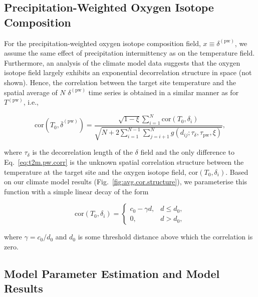 \documentclass[draft]{agujournal2019}
\begin{document}
\subsection{Precipitation-Weighted Oxygen Isotope Composition}
\label{app:concept.model.oxy.pw}

For the precipitation-weighted oxygen isotope composition field, $x \equiv
\delta^{\mathrm{(pw)}}$, we assume the same effect of precipitation
intermittency as on the temperature field. Furthermore, an analysis of the
climate model data suggests that the oxygen isotope field largely exhibits
an exponential decorrelation structure in space (not shown). Hence, the
correlation between the target site temperature and the spatial average of $N$
$\delta^{\mathrm{(pw)}}$ time series is obtained in a similar manner as for
$T^{\mathrm{(pw)}}$, i.e.,
%
\begin{linenomath*}
\begin{equation}
\label{eq:oxy.pw.corr}
\mathrm{cor}\left(T_0,
  \overline{\delta}^{\mathrm{(pw)}}\right)=
\frac
{\sqrt{1-\xi}\sum_{i=1}^{N}\mathrm{cor}\left(T_0,\delta_i\right)}
{\sqrt{N + 2\sum_{i=1}^{N-1}\sum_{j=i+1}^{N}
  g(d_{ij}; \tau_{\delta}, \tau_{\mathrm{pw}}, \xi)}},
\end{equation}
\end{linenomath*}
%
where $\tau_{\delta}$ is the decorrelation length of the $\delta$ field and the
only difference to Eq.~\eqref{eq:t2m.pw.corr} is the unknown spatial correlation
structure between the temperature at the target site and the oxygen isotope
field, $\mathrm{cor}\left(T_0,\delta_i\right)$.  Based on our climate model
results (Fig.~\ref{fig:avg.cor.structure}), we parameterise this function with a
simple linear decay of the form
%
\begin{linenomath*}
\begin{equation}
\label{eq:t2m.oxy.corr}
\mathrm{cor}\left(T_0,\delta_i\right)=
\begin{cases}
  c_0 - \gamma d, & d \le d_0,\\
  0, & d > d_0,
\end{cases}
\end{equation}
\end{linenomath*}
%
where $\gamma=c_0/d_0$ and $d_0$ is some threshold distance above which
the correlation is zero.

\subsection{Model Parameter Estimation and Model Results}
\label{app:concept.model.estimation}
\end{document}
